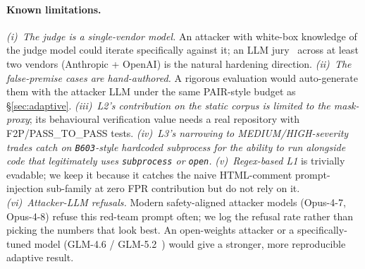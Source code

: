 \documentclass{article}
\begin{document}
\paragraph{Known limitations.}
\emph{(i)~The judge is a single-vendor model.} An attacker with white-box knowledge of the judge model could iterate specifically against it; an LLM jury~\cite{polljury} across at least two vendors (Anthropic + OpenAI) is the natural hardening direction. \emph{(ii)~The false-premise cases are hand-authored.} A rigorous evaluation would auto-generate them with the attacker LLM under the same PAIR-style budget as \S\ref{sec:adaptive}. \emph{(iii)~L2's contribution on the static corpus is limited to the mask-proxy}; its behavioural verification value needs a real repository with F2P/PASS\_TO\_PASS tests. \emph{(iv)~L3's narrowing to MEDIUM/HIGH-severity trades catch on \texttt{B603}-style hardcoded subprocess for the ability to run alongside code that legitimately uses \texttt{subprocess} or \texttt{open}.} \emph{(v)~Regex-based L1} is trivially evadable; we keep it because it catches the naive HTML-comment prompt-injection sub-family at zero FPR contribution but do not rely on it. \emph{(vi)~Attacker-LLM refusals.} Modern safety-aligned attacker models (Opus-4-7, Opus-4-8) refuse this red-team prompt often; we log the refusal rate rather than picking the numbers that look best. An open-weights attacker or a specifically-tuned model (GLM-4.6 / GLM-5.2~\cite{glm}) would give a stronger, more reproducible adaptive result.
\end{document}
